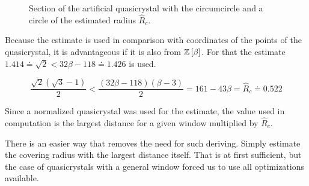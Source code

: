 \documentclass[text.tex]{subfiles}
\begin{document}
\begin{figure}[h!]
\centering
{}
\caption{Section of the artificial quasicrystal with the circumcircle and a circle of the estimated radius $\hat{R}_c$.}
\label{fig:coveringRadius}
\end{figure}

Because the estimate is used in comparison with coordinates of the points of the quasicrystal, it is advantageous if it is also from $\mathbb{Z}\left[\beta\right]$. For that the estimate $1.414 \doteq \sqrt{2} <32\beta-118 \doteq 1.426$ is used.

$$\frac{\sqrt{2}(\sqrt{3}-1)}{2} < \frac{(32\beta-118)(\beta-3)}{2} = 161-43\beta = \hat{R}_c \doteq 0.522$$

Since a normalized quasicrystal was used for the estimate, the value used in computation is the largest distance for a given window multiplied by $\hat{R}_c$.

\begin{remark}
There is an easier way that removes the need for such deriving. Simply estimate the covering radius with the largest distance itself. That is at first sufficient, but the case of  quasicrystals with a general window forced us to use all optimizations available.
\end{remark}
\end{document}
